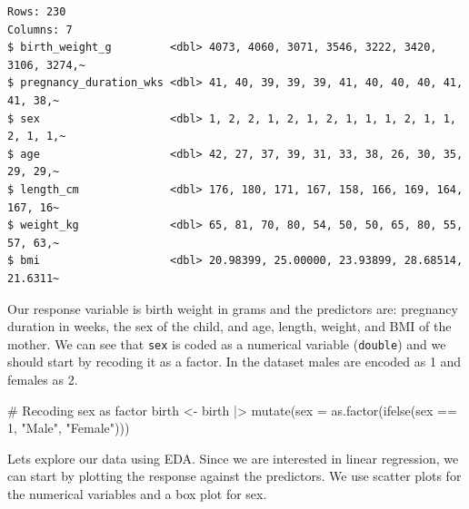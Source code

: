 \documentclass[
  letterpaper,
  DIV=11,
  numbers=noendperiod]{scrreprt}
\newenvironment{Shaded}{\begin{snugshade}}{\end{snugshade}}
\newcommand{\AttributeTok}[1]{\textcolor[rgb]{0.40,0.45,0.13}{#1}}
\newcommand{\CommentTok}[1]{\textcolor[rgb]{0.37,0.37,0.37}{#1}}
\newcommand{\DecValTok}[1]{\textcolor[rgb]{0.68,0.00,0.00}{#1}}
\newcommand{\FunctionTok}[1]{\textcolor[rgb]{0.28,0.35,0.67}{#1}}
\newcommand{\NormalTok}[1]{\textcolor[rgb]{0.00,0.23,0.31}{#1}}
\newcommand{\OtherTok}[1]{\textcolor[rgb]{0.00,0.23,0.31}{#1}}
\newcommand{\SpecialCharTok}[1]{\textcolor[rgb]{0.37,0.37,0.37}{#1}}
\newcommand{\StringTok}[1]{\textcolor[rgb]{0.13,0.47,0.30}{#1}}
\begin{document}
\begin{verbatim}
Rows: 230
Columns: 7
$ birth_weight_g         <dbl> 4073, 4060, 3071, 3546, 3222, 3420, 3106, 3274,~
$ pregnancy_duration_wks <dbl> 41, 40, 39, 39, 39, 41, 40, 40, 40, 41, 41, 38,~
$ sex                    <dbl> 1, 2, 2, 1, 2, 1, 2, 1, 1, 1, 2, 1, 1, 2, 1, 1,~
$ age                    <dbl> 42, 27, 37, 39, 31, 33, 38, 26, 30, 35, 29, 29,~
$ length_cm              <dbl> 176, 180, 171, 167, 158, 166, 169, 164, 167, 16~
$ weight_kg              <dbl> 65, 81, 70, 80, 54, 50, 50, 65, 80, 55, 57, 63,~
$ bmi                    <dbl> 20.98399, 25.00000, 23.93899, 28.68514, 21.6311~
\end{verbatim}

Our response variable is birth weight in grams and the predictors are:
pregnancy duration in weeks, the sex of the child, and age, length,
weight, and BMI of the mother. We can see that \texttt{sex} is coded as
a numerical variable (\texttt{double}) and we should start by recoding
it as a factor. In the dataset males are encoded as 1 and females as 2.

\begin{Shaded}
\begin{Highlighting}[]
\CommentTok{\# Recoding sex as factor}
\NormalTok{birth }\OtherTok{\textless{}{-}}\NormalTok{ birth }\SpecialCharTok{|\textgreater{}}  \FunctionTok{mutate}\NormalTok{(}\AttributeTok{sex =} \FunctionTok{as.factor}\NormalTok{(}\FunctionTok{ifelse}\NormalTok{(sex }\SpecialCharTok{==} \DecValTok{1}\NormalTok{, }\StringTok{"Male"}\NormalTok{, }\StringTok{"Female"}\NormalTok{)))}
\end{Highlighting}
\end{Shaded}

Lets explore our data using EDA. Since we are interested in linear
regression, we can start by plotting the response against the
predictors. We use scatter plots for the numerical variables and a box
plot for sex.
\end{document}
